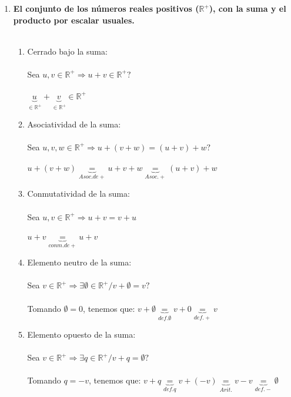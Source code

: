 \documentclass{article}
\begin{document}
\begin{enumerate}[1.]








\item \textbf{El conjunto de los números reales positivos ($\mathbb{R}^+$), con la suma y el producto por 
escalar usuales.} \\ \\


	\begin{enumerate}[(1)]
		\item
			Cerrado bajo la suma: \\ \\
			Sea $u,v \in \mathbb{R}^+ \Rightarrow u+v \in \mathbb{R}^+?$ \\ \\
			$\underbrace{u}_{\in \mathbb{R}^+} + \underbrace{v}_{\in \mathbb{R}^+} \in \mathbb{R}^+$
		\item
			Asociatividad de la suma: \\ \\
			Sea $u,v,w \in \mathbb{R}^+ \Rightarrow u+(v+w) = (u+v)+w?$ \\ \\ 
			$u+(v+w) \underbrace{=}_{Asoc. de +} u+v+w \underbrace{=}_{Asoc.+} (u+v)+w$
		\item
			Conmutatividad de la suma: \\ \\
			Sea $u,v \in \mathbb{R}^+ \Rightarrow u+v = v+u$ \\ \\
			$u+v \underbrace{=}_{conm.de +} u+v$
		\item 
			Elemento neutro de la suma: \\ \\
			Sea $v \in \mathbb{R}^+ \Rightarrow \exists \emptyset \in \mathbb{R}^+ / v+\emptyset = v?$ \\ \\
			Tomando $\emptyset = 0$, tenemos que: 
			$v+\emptyset \underbrace{=}_{def.\emptyset} v+0 \underbrace{=}_{def.+} v$
		\item
			Elemento opuesto de la suma: \\ \\
			Sea $v \in \mathbb{R}^+ \Rightarrow \exists q \in \mathbb{R}^+ / v+q = \emptyset?$ \\ \\
			Tomando $q=-v$, tenemos que: 
			$v +q \underbrace{=}_{def.q} v + (-v) \underbrace{=}_{Arit.} v - v \underbrace{=}_{def. -} \emptyset$ \\

\end{enumerate}
\end{enumerate}
\end{document}
